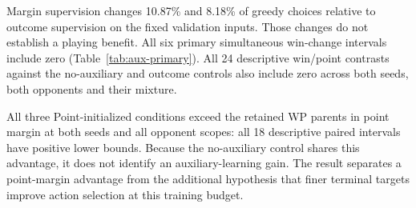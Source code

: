 Margin supervision changes 10.87\% and 8.18\% of greedy choices relative to
outcome supervision on the fixed validation inputs. Those changes do not
establish a playing benefit. All six primary simultaneous win-change intervals
include zero (Table~\ref{tab:aux-primary}). All 24 descriptive win/point
contrasts against the no-auxiliary and outcome controls also include zero
across both seeds, both opponents and their mixture.

\begin{table}[htbp]
\centering\small

\caption{Equal-mixture development win changes from margin supervision. One simultaneous 95\%
family covers all six contrasts; 131,072 matches use shared deals and both
seats. The 10,000-replicate bootstrap resamples 4,096 compound blocks.}
\label{tab:aux-primary}
\end{table}

All three Point-initialized conditions exceed the retained WP parents in point
margin at both seeds and all opponent scopes: all 18 descriptive paired
intervals have positive lower bounds. Because the no-auxiliary control shares
this advantage, it does not identify an auxiliary-learning gain. The result
separates a point-margin advantage from the additional hypothesis
that finer terminal targets improve action selection at this training budget.

